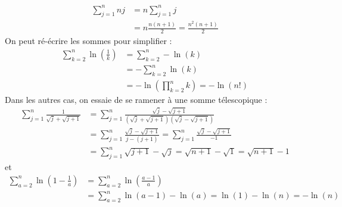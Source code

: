 {{\begin{align*}
 \sum_{j=1}^n nj &= n \sum_{j=1}^n j \\ &= n\frac{n(n+1)}{2}= \frac{n^2(n+1)}{2}
\end{align*}
On peut ré-écrire les sommes pour simplifier :
\begin{align*}
 \sum_{k=2}^{n} \ln\left(\frac{1}{k}\right) &=  \sum_{k=2}^n -\ln(k) \\
 &= -\sum_{k=2}^n \ln(k) \\
 &= - \ln\left(\prod_{k=2}^n k \right) = -\ln(n!)
\end{align*}
Dans les autres cas, on essaie de se ramener à une somme télescopique :
\begin{align*}
 \boxed{\sum_{j=1}^n \frac{1}{\sqrt{j}+\sqrt{j+1}}} &= \sum_{j=1}^n \frac{\sqrt{j}-\sqrt{j+1}}{\left(\sqrt{j}+\sqrt{j+1}\right)\left(\sqrt{j}-\sqrt{j+1}\right)} \\
 &= \sum_{j=1}^n \frac{\sqrt{j}-\sqrt{j+1}}{j-(j+1)} = \sum_{j=1}^n \frac{\sqrt{j}-\sqrt{j+1}}{-1} \\
 &= \sum_{j=1}^n \sqrt{j+1}-\sqrt{j} = \sqrt{n+1}-\sqrt{1}=\boxed{\sqrt{n+1}-1}
\end{align*}
et
\begin{align*}
 \boxed{\sum_{a=2}^n \ln \left(1-\frac{1}{a}\right)} &= \sum_{a=2}^n \ln \left( \frac{a-1}{a}\right) \\
 &= \sum_{a=2}^n \ln(a-1) - \ln(a) = \ln(1)-\ln(n)=\boxed{-\ln(n)}
\end{align*}}
}

